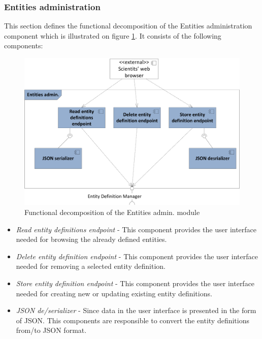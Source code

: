 \subsubsection{Entities administration}
This section defines the functional decomposition of the Entities administration component which is illustrated on figure \ref{fig:storageFuncAdmin}. It consists of the following components:

\begin{figure}[h!]
  \centering
  	\includegraphics[scale=0.75]{storage/functional/func_admin.png}
  \caption{Functional decomposition of the Entities admin. module}
  \label{fig:storageFuncAdmin}
\end{figure}

\begin{itemize}
	\item \textit{Read entity definitions endpoint} - This component provides the user interface needed for browsing the already defined entities.
	
	\item \textit{Delete entity definition endpoint} - This component provides the user interface needed for removing a selected entity definition.
	 
	\item \textit{Store entity definition endpoint} - This component provides the user interface needed for creating new or updating existing entity definitions.
	
	\item \textit{JSON de/serializer} - Since data in the user interface is presented in the form of JSON. This components are responsible to convert the entity definitions from/to JSON format.
	
\end{itemize}

